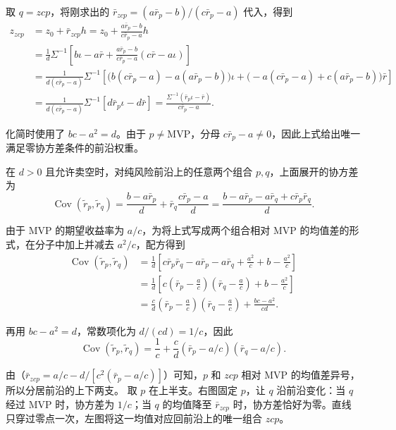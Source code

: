 \begin{solution}[label-content={证明},blank-type=none]
取 $q=zcp$，将刚求出的 $\bar r_{zcp}=(a\bar r_p-b)/(c\bar r_p-a)$ 代入，得到
\[
 \begin{aligned}
 z_{zcp}
 &=z_0+\bar r_{zcp}h
 =z_0+\frac{a\bar r_p-b}{c\bar r_p-a}h\\
 &=\frac1d\Sigma^{-1}\left[
 b\iota-a\bar r
 +\frac{a\bar r_p-b}{c\bar r_p-a}(c\bar r-a\iota)
 \right]\\
 &=\frac{1}{d(c\bar r_p-a)}\Sigma^{-1}\left[
 \bigl(b(c\bar r_p-a)-a(a\bar r_p-b)\bigr)\iota
 +\bigl(-a(c\bar r_p-a)+c(a\bar r_p-b)\bigr)\bar r
 \right]\\
 &=\frac{1}{d(c\bar r_p-a)}\Sigma^{-1}
 \left[d\bar r_p\iota-d\bar r\right]
 =\frac{\Sigma^{-1}(\bar r_p\iota-\bar r)}{c\bar r_p-a}.
 \end{aligned}
\]

化简时使用了 $bc-a^2=d$。由于 $p\ne\mathrm{MVP}$，分母 $c\bar r_p-a\ne0$，因此上式给出唯一满足零协方差条件的前沿权重。
\end{solution}

在 $d>0$ 且允许卖空时，对纯风险前沿上的任意两个组合 $p,q$，上面展开的协方差为
\[
 \operatorname{Cov}(\widetilde r_p,\widetilde r_q)
 =\frac{b-a\bar r_p}{d}+\bar r_q\frac{c\bar r_p-a}{d}
 =\frac{b-a\bar r_p-a\bar r_q+c\bar r_p\bar r_q}{d}.
\]

由于 MVP 的期望收益率为 $a/c$，为将上式写成两个组合相对 MVP 的均值差的形式，在分子中加上并减去 $a^2/c$，配方得到
\[
 \begin{aligned}
 \operatorname{Cov}(\widetilde r_p,\widetilde r_q)
 &=\frac1d\left[
 c\bar r_p\bar r_q-a\bar r_p-a\bar r_q+\frac{a^2}{c}
 +b-\frac{a^2}{c}\right]\\
 &=\frac1d\left[
 c\left(\bar r_p-\frac ac\right)\left(\bar r_q-\frac ac\right)
 +b-\frac{a^2}{c}\right]\\
 &=\frac cd\left(\bar r_p-\frac ac\right)\left(\bar r_q-\frac ac\right)
 +\frac{bc-a^2}{cd}.
 \end{aligned}
\]

再用 $bc-a^2=d$，常数项化为 $d/(cd)=1/c$，因此
\begin{equation*}
 \operatorname{Cov}(\widetilde r_p,\widetilde r_q)
 =\frac1c+\frac cd(\bar r_p-a/c)(\bar r_q-a/c).
 \tag{12.X}\label{eq:wj-12-frontier-covariance}
\end{equation*}

由（$\bar r_{zcp}=a/c-d/[c^2(\bar r_p-a/c)]$）可知，$p$ 和 $zcp$ 相对 MVP 的均值差异号，所以分居前沿的上下两支。 取 $p$ 在上半支。右图固定 $p$，让 $q$ 沿前沿变化：当 $q$ 经过 MVP 时，协方差为 $1/c$；当 $q$ 的均值降至 $\bar r_{zcp}$ 时，协方差恰好为零。直线只穿过零点一次，左图将这一均值对应回前沿上的唯一组合 $zcp$。

